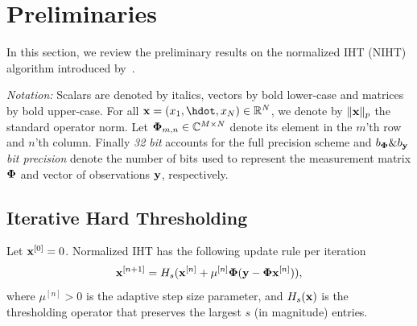 \documentclass{article}
\begin{document}
\section{Preliminaries}\label{section_iht}

In this section, we review the preliminary results on the normalized IHT (NIHT) algorithm introduced by~\cite{blumensath2010niht, blumensath2012greedy}.

{\it Notation:} Scalars are denoted by italics, vectors by bold lower-case and matrices by bold upper-case. For all ${\bf x}= (x_1, \hdot, x_N) \in \mathbb{R}^N$, we denote by $\|{\bf x}\|_p$ the standard operator norm. Let ${\bf \Phi}_{m, n}\in \mathbb{C}^{M\times N}$ denote its element in the $m$'th row and $n$'th column. Finally {\it 32 bit} accounts for the full precision scheme and $b_{\bf \Phi}\&b_{\bf y}${\it bit precision} denote the number of bits used to represent the measurement matrix ${\bf \Phi}$ and vector of observations ${\bf y}$, respectively.
\subsection{Iterative Hard Thresholding} 
Let ${\bf x}^{[0]} = 0$. Normalized IHT has the following update rule per iteration
\begin{equation}\label{iht_update_rule}
{\bf x}^{[n+1]} = H_s({\bf x}^{[n]} + \mu^{[n]}{\bf \Phi}({\bf y}-{\bf \Phi}{\bf x}^{[n]})),
\end{equation}
where $\mu^{[n]}>0$ is the adaptive step size parameter, and $H_s({\bf x})$ is the
thresholding operator that preserves the largest $s$ (in magnitude) entries.



\end{document}
